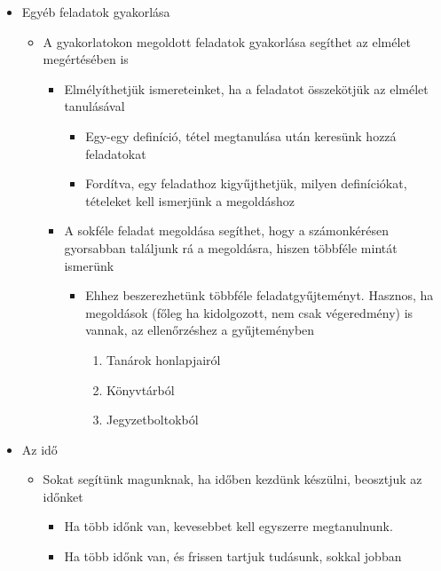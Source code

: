 \documentclass[../Main.tex]{subfiles}
\begin{document}
\begin{itemize}
    \item Egyéb feladatok gyakorlása
    \begin{itemize}
        \item A gyakorlatokon megoldott feladatok gyakorlása segíthet az elmélet
        megértésében is
        \begin{itemize}
            \item Elmélyíthetjük ismereteinket, ha a feladatot összekötjük az elmélet
            tanulásával
            \begin{itemize}
                \item Egy-egy definíció, tétel megtanulása után keresünk hozzá
                feladatokat
                \item Fordítva, egy feladathoz kigyűjthetjük, milyen definíciókat,
                tételeket kell ismerjünk a megoldáshoz
            \end{itemize}
            \item A sokféle feladat megoldása segíthet, hogy a számonkérésen
            gyorsabban találjunk rá a megoldásra, hiszen többféle mintát
            ismerünk
            \begin{itemize}
                \item Ehhez beszerezhetünk többféle feladatgyűjteményt. Hasznos,
                ha megoldások (főleg ha kidolgozott, nem csak végeredmény)
                is vannak, az ellenőrzéshez a gyűjteményben
                \begin{enumerate}
                    \item Tanárok honlapjairól
                    \item Könyvtárból
                    \item Jegyzetboltokból
                \end{enumerate}
            \end{itemize}
        \end{itemize}
    \end{itemize}
    \item Az idő
    \begin{itemize}
        \item Sokat segítünk magunknak, ha időben kezdünk készülni, beosztjuk az
        időnket
        \begin{itemize}
            \item Ha több időnk van, kevesebbet kell egyszerre megtanulnunk.
            \item Ha több időnk van, és frissen tartjuk tudásunk, sokkal jobban

\end{itemize}
\end{itemize}
\end{itemize}
\end{document}
